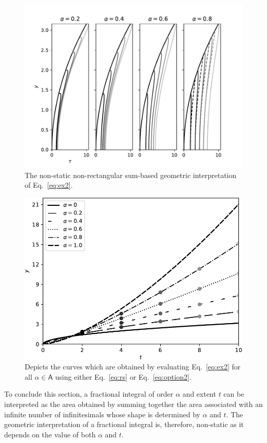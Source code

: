 \documentclass{article}
\theoremstyle{theorem}
\theoremstyle{definition}
\begin{document}
\begin{figure}[htb]
\centering
\includegraphics[width=1\textwidth]{geo_int2.pdf}
\caption{The non-static non-rectangular sum-based geometric interpretation of Eq.~\eqref{eq:ex2}.}
\label{fig:geo2}
\end{figure}

\begin{figure}[htb]
\centering
\includegraphics[width=1\textwidth]{func_eval2.pdf}
\caption{Depicts the curves which are obtained by evaluating Eq.~\eqref{eq:ex2} for all $\alpha\in \mathsf{A}$ using either Eq.~\eqref{eq:rs} or Eq.~\eqref{eq:option2}.}
\label{fig:eval2}
\end{figure}


To conclude this section, a fractional integral of order $\alpha$ and extent $t$ can be interpreted as the area obtained by summing together the area associated with an infinite number of infinitesimals whose 
shape is determined by $\alpha$ and $t$. The geometric interpretation of a fractional integral is, therefore, non-static as it depends on the value of both $\alpha$ and $t$. 
\end{document}
